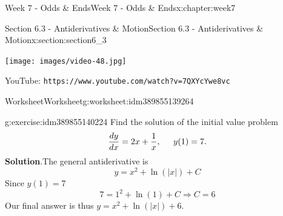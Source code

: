 \documentclass[oneside,10pt,]{book}
\newcommand{\blocktitlefont}{\relax}
\newcommand{\mono}[1]{\texttt{#1}}
\numberwithin{equation}{section}
\newlength{\qrsize}
\newlength{\previewwidth}
\begin{document}
\begin{chapterptx}{Week 7 - Odds \& Ends}{}{Week 7 - Odds \& Ends}{}{}{x:chapter:week7}
%
%
\typeout{************************************************}
\typeout{************************************************}
%
\begin{sectionptx}{Section 6.3 - Antiderivatives \& Motion}{}{Section 6.3 - Antiderivatives \& Motion}{}{}{x:section:section6_3}
\setlength{\qrsize}{9em}
\setlength{\previewwidth}{\linewidth}
\addtolength{\previewwidth}{-\qrsize}
\begin{tcbraster}[raster columns=2, raster column skip=1pt, raster halign=center, raster force size=false, raster left skip=0pt, raster right skip=0pt]%
\begin{tcolorbox}[previewstyle, width=\previewwidth]%
\texttt{[image: images/video-48.jpg]}%
\end{tcolorbox}%
\begin{tcolorbox}[qrstyle]%
{\hypersetup{urlcolor=black}}%
\end{tcolorbox}%
\begin{tcolorbox}[captionstyle]%
\small YouTube: \mono{https://www.youtube.com/watch?v=7QXYcYwe8vc}\end{tcolorbox}%
\end{tcbraster}%
%
%
\typeout{************************************************}
\typeout{************************************************}
%
\begin{worksheet-subsection}{Worksheet}{}{Worksheet}{}{}{g:worksheet:idm389855139264}
\begin{divisionexercise}{1}{}{}{g:exercise:idm389855140224}%
Find the solution of the initial value problem%
%
\begin{equation*}
\frac{dy}{dx} = 2x+\frac{1}{x}, \hspace{.2in} y(1) = 7 .
\end{equation*}
\textbf{\blocktitlefont Solution}.\hypertarget{g:solution:idm389855148176}{}\quad{}The general antiderivative is%
%
\begin{equation*}
y = x^2+\ln(|x|)+C 
\end{equation*}
Since \(y(1)=7\)%
%
\begin{equation*}
7 = 1^2+\ln(1)+C \Rightarrow C=6 
\end{equation*}
Our final answer is thus \(y = x^2+\ln(|x|)+6\).%

\end{divisionexercise}
\end{worksheet-subsection}
\end{sectionptx}
\end{chapterptx}
\end{document}
